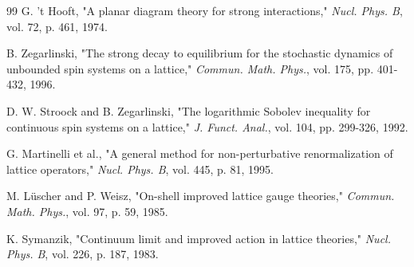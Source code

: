\begin{thebibliography}{99}
G. 't Hooft, "A planar diagram theory for strong interactions," \textit{Nucl. Phys. B}, vol. 72, p. 461, 1974.

B. Zegarlinski, "The strong decay to equilibrium for the stochastic dynamics of unbounded spin systems on a lattice," \textit{Commun. Math. Phys.}, vol. 175, pp. 401-432, 1996.

D. W. Stroock and B. Zegarlinski, "The logarithmic Sobolev inequality for continuous spin systems on a lattice," \textit{J. Funct. Anal.}, vol. 104, pp. 299-326, 1992.

G. Martinelli et al., "A general method for non-perturbative renormalization of lattice operators," \textit{Nucl. Phys. B}, vol. 445, p. 81, 1995.

M. Lüscher and P. Weisz, "On-shell improved lattice gauge theories," \textit{Commun. Math. Phys.}, vol. 97, p. 59, 1985.

K. Symanzik, "Continuum limit and improved action in lattice theories," \textit{Nucl. Phys. B}, vol. 226, p. 187, 1983.

\end{thebibliography}
